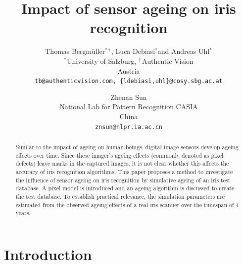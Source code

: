 \documentclass[10pt,twocolumn,letterpaper]{article}
\newcommand{\superscript}[1]{\ensuremath{^{\textrm{#1}}}}
\def\wu{\superscript{*}}
\def\wg{\superscript{\dag}}
\begin{document}
\title{Impact of sensor ageing on iris recognition}

\author{Thomas Bergm{\"u}ller\wu\wg, Luca Debiasi\wu and Andreas Uhl\wu\\
\wu University of Salzburg, \wg Authentic Vision\\
Austria\\
{\tt\small tb@authenticvision.com, \tt\small \{ldebiasi,uhl\}@cosy.sbg.ac.at}
\and
Zhenan Sun\\
National Lab for Pattern Recognition CASIA\\
China\\
{\tt\small znsun@nlpr.ia.ac.cn}
}


\maketitle
\thispagestyle{empty}

\begin{abstract}
   Similar to the impact of ageing on human beings, digital image sensors develop ageing effects over time. Since these imager's ageing effects (commonly denoted as pixel defects) leave marks in the captured images, it is not clear whether this affects the accuracy of iris recognition algorithms. This paper proposes a method to investigate the influence of sensor ageing on iris recognition by simulative ageing of an iris test database. A pixel model is introduced and an ageing algorithm is discussed to create the test database. To establish practical relevance, the simulation parameters are estimated from the observed ageing effects of a real iris scanner over the timespan of 4 years.
\end{abstract}




\section{Introduction}
\end{document}
